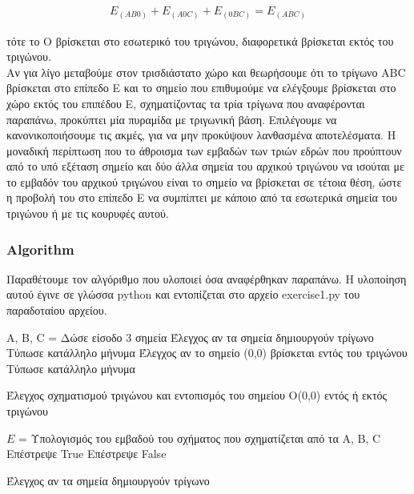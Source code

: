 \documentclass[12pt]{article}
\begin{document}
\begin{align*}
E_{(AB0)} + E_{(A0C)} + E_{(0BC)} = E_{(ABC)}
\end{align*}

τότε το O βρίσκεται στο εσωτερικό του τριγώνου, διαφορετικά βρίσκεται εκτός του τριγώνου. \\

Αν για λίγο μεταβούμε στον τρισδιάστατο χώρο και θεωρήσουμε ότι το τρίγωνο ABC βρίσκεται στο επίπεδο E και το σημείο που επιθυμούμε να ελέγξουμε βρίσκεται στο χώρο εκτός του επιπέδου Ε, σχηματίζοντας τα τρία τρίγωνα που αναφέρονται παραπάνω, προκύπτει μία πυραμίδα με τριγωνική βάση. Επιλέγουμε να κανονικοποιήσουμε τις ακμές, για να μην προκύψουν λανθασμένα αποτελέσματα. Η μοναδική περίπτωση που το άθροισμα των εμβαδών των τριών εδρών που προύπτουν από το υπό εξέταση σημείο και δύο άλλα σημεία του αρχικού τριγώνου να ισούται με το εμβαδόν του αρχικού τριγώνου είναι το σημείο να βρίσκεται σε τέτοια θέση, ώστε η προβολή του στο επίπεδο E να συμπίπτει με κάποιο από τα εσωτερικά σημεία του τριγώνου ή με τις κουρυφές αυτού. \\

\subsubsection*{Algorithm}

Παραθέτουμε τον αλγόριθμο που υλοποιεί όσα αναφέρθηκαν παραπάνω. Η υλοποίηση αυτού έγινε σε γλώσσα python και εντοπίζεται στο αρχείο exercise1.py του παραδοταίου αρχείου.

\begin{algorithm}[H]
	\SetAlgoLined

	A, B, C = Δώσε είσοδο 3 σημεία \;
	Έλεγχος αν τα σημεία δημιουργούν τρίγωνο \;
	{Τύπωσε κατάλληλο μήνυμα \;
	Έλεγχος αν το σημείο (0,0) βρίσκεται εντός του τριγώνου \;}
	{Τύπωσε κατάλληλο μήνυμα \;}

	\caption{Έλεγχος σχηματισμού τριγώνου και εντοπισμός του σημείου O(0,0) εντός ή εκτός τριγώνου}
\end{algorithm}

\begin{algorithm}[H]
	\SetAlgoLined

	\(Ε\) = Υπολογισμός του εμβαδού του σχήματος που σχηματίζεται από τα A, B, C \;
	{Επέστρεψε True \;}
	{Επέστρεψε False \;}

	\caption{Έλεγχος αν τα σημεία δημιουργούν τρίγωνο}
\end{algorithm}
\end{document}
